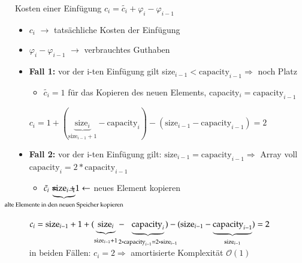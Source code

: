 \documentclass[11pt, fleqn]{scrreprt}
\begin{document}
Kosten einer Einfügung $c_i = \tilde{c_i} + \varphi_i - \varphi_{i-1}$\\
\begin{itemize}
	\item $c_i$ $\rightarrow$ tatsächliche Kosten der Einfügung
	\item $ \varphi_i - \varphi_{i-1}$ $\rightarrow$ verbrauchtes Guthaben
\end{itemize}

\begin{itemize}
	\item \textbf{Fall 1:} vor der i-ten Einfügung gilt size$_{i-1} < \text{capacity}_{i-1} \Rightarrow$ noch Platz
	\begin{itemize}[label={$\Rightarrow$}]
		\item $\tilde{c_i} = 1$ für das Kopieren des neuen Elements, capacity$_i = \text{capacity}_{i-1}$
	\end{itemize}
	$c_i = 1 + (\underbrace{\text{size}_i}_{\text{size}_{i-1}+1}- \text{capacity}_i) - (\text{size}_{i-1} - \text{capacity}_{i-1}) = 2$
	
	\item \textbf{Fall 2:} vor der i-ten Einfügung gilt: $\text{size}_{i-1} = \text{capacity}_{i-1} \Rightarrow $ Array voll \\
	\hspace*{7.8cm}  $\text{capacity}_{i} = 2*\text{capacity}_{i-1} $ \\  
	\begin{itemize}[label={$\Rightarrow$}]
		\item   $\tilde{c_i} = \hspace*{-2.3cm}\underbrace{\text{size}_{i-1}}_{\text{alte Elemente in den neuen Speicher kopieren}}\hspace*{-2.3cm}+  1 \leftarrow$ neues Element kopieren
	\end{itemize}
	$c_i = \text{size}_{i-1} + 1 + (\underbrace{\text{size}_{i}}_{\text{size}_{i-1}+1} - \hspace*{-0.3cm} \underbrace{\text{capacity}_{i}}_{2*\text{capacity}_{i-1} = 2* \text{size}_{i-1}}\hspace*{-0.5cm}) - (\text{size}_{i-1} -\underbrace{ \text{capacity}_{i-1}}_{\text{size}_{i-1}}) = 2$ \\
	
	in beiden Fällen: $c_i = 2 \Rightarrow$ amortisierte Komplexität $\mathcal{O}(1)$
\end{itemize}
\end{document}
